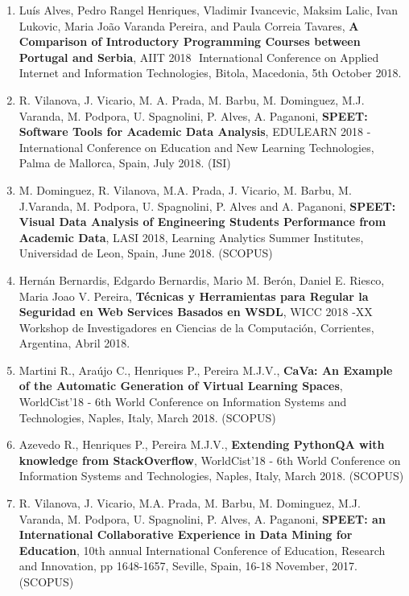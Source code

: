 \documentclass[11pt]{article}
\begin{document}
\begin{enumerate}
\item {Luís Alves, Pedro Rangel Henriques, Vladimir Ivancevic, Maksim Lalic, Ivan Lukovic, Maria João Varanda Pereira, and Paula Correia Tavares, {\bf{ A Comparison of Introductory Programming Courses between Portugal and Serbia}}, AIIT 2018  International Conference on Applied Internet and Information Technologies, Bitola, Macedonia, 5th October 2018.}

\item {R. Vilanova, J. Vicario, M. A. Prada, M. Barbu, M. Dominguez, M.J. Varanda, M. Podpora, U. Spagnolini, P. Alves, A. Paganoni, {\bf{ SPEET: Software Tools for Academic Data Analysis}}, EDULEARN 2018 - International Conference on Education and New Learning Technologies, Palma de Mallorca, Spain, July 2018. (ISI)}

\item {M. Dominguez, R. Vilanova, M.A. Prada, J. Vicario, M. Barbu, M. J.Varanda, M. Podpora, U. Spagnolini, P. Alves and A. Paganoni, {\bf{ SPEET: Visual Data Analysis of Engineering Students Performance from Academic Data}}, LASI 2018, Learning Analytics Summer Institutes, Universidad de Leon, Spain, June 2018. (SCOPUS)}

\item {Hernán Bernardis, Edgardo Bernardis, Mario M. Berón, Daniel E. Riesco, Maria Joao V. Pereira, {\bf{ Técnicas y Herramientas para Regular la Seguridad en Web Services Basados en WSDL}}, WICC 2018 -XX Workshop de Investigadores en Ciencias de la Computación, Corrientes, Argentina, Abril 2018.}

\item {Martini R., Araújo C., Henriques P., Pereira M.J.V., {\bf{ CaVa: An Example of the Automatic Generation of Virtual Learning Spaces}}, WorldCist'18 - 6th World Conference on Information Systems and Technologies, Naples, Italy, March 2018. (SCOPUS)}

\item {Azevedo R., Henriques P., Pereira M.J.V., {\bf{ Extending PythonQA with knowledge from StackOverflow}}, WorldCist'18 - 6th World Conference on Information Systems and Technologies, Naples, Italy, March 2018. (SCOPUS)}

\item {R. Vilanova, J. Vicario, M.A. Prada, M. Barbu, M. Dominguez, M.J. Varanda, M. Podpora, U. Spagnolini, P. Alves, A. Paganoni, {\bf{ SPEET: an International Collaborative Experience in Data Mining for Education}}, 10th annual International Conference of Education, Research and Innovation, pp 1648-1657, Seville, Spain, 16-18 November, 2017.(SCOPUS)}


\end{enumerate}
\end{document}
